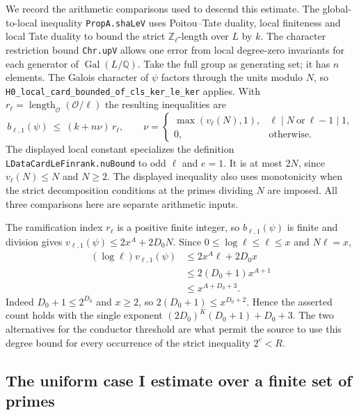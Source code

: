 We record the arithmetic comparisons used to descend this estimate.
The global-to-local inequality \texttt{Prop\allowbreak{}A.\allowbreak{}sha\allowbreak{}Le\allowbreak{}V} uses
Poitou--Tate duality, local finiteness and local Tate duality to
bound the strict \(\mathbb Z_\ell\)-length over \(L\) by \(k\).
The character restriction bound \texttt{Chr.\allowbreak{}up\allowbreak{}V} allows one error
from local degree-zero invariants for each generator of
\(\operatorname{Gal}(L/\mathbb Q)\). Take the full group as generating
set; it has \(n\) elements. The Galois character of \(\psi\) factors
through the units modulo \(N\), so
\texttt{H0\_\allowbreak{}local\_\allowbreak{}card\_\allowbreak{}bounded\_\allowbreak{}of\_\allowbreak{}cls\_\allowbreak{}ker\_\allowbreak{}le\_\allowbreak{}ker} applies.
With \(r_\ell=\operatorname{length}_{\mathcal O}(\mathcal O/\ell)\)
the resulting inequalities are
\[
    b_{\ell,1}(\psi)\ \le\ (k+n\nu)\,r_\ell,\qquad
    \nu=
    \begin{cases}
       \max(v_\ell(N),1),&\ell\mid N\ \text{or}\ \ell-1\mid 1,\\
       0,&\text{otherwise}.
    \end{cases}
\]
The displayed local constant specializes the definition
\texttt{LData\allowbreak{}Card\allowbreak{}Le\allowbreak{}Finrank.\allowbreak{}nu\allowbreak{}Bound} to odd \(\ell\) and \(e=1\).
It is at most \(2N\), since \(v_\ell(N)\le N\) and \(N\ge2\).
The displayed inequality also uses monotonicity when the strict
decomposition conditions at the primes dividing \(N\) are imposed.
All three comparisons here are separate arithmetic inputs.

The ramification index \(r_\ell\) is a positive finite integer,
so \(b_{\ell,1}(\psi)\) is finite and division gives
\(v_{\ell,1}(\psi)\le2x^A+2D_0 N\).
Since \(0\le\log\ell\le\ell\le x\) and \(N\ell=x\),
\[
\begin{aligned}
  (\log\ell)v_{\ell,1}(\psi)
   &\le 2x^A\ell+2D_0 x\\
   &\le 2(D_0+1)x^{A+1}\\
   &\le x^{A+D_0+3}.
\end{aligned}
\]
Indeed \(D_0+1\le2^{D_0}\) and \(x\ge2\), so
\(2(D_0+1)\le x^{D_0+2}\). Hence the asserted count holds with the
single exponent \((2D_0)^K(D_0+1)+D_0+3\). The two alternatives for
the conductor threshold are what permit the source to use this
degree bound for every occurrence of the strict inequality \(2^c<R\).

\subsection{The uniform case I estimate over a finite set of primes}

